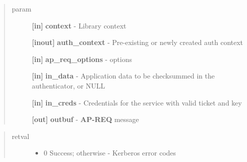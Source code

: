 \documentclass[letterpaper,10pt,english]{sphinxmanual}
\begin{document}
\begin{fulllineitems}
\label{appdev/refs/api/krb5_mk_req_extended:c.krb5_mk_req_extended}
\end{fulllineitems}

\begin{quote}\begin{description}
\item[{param}] \leavevmode
\textbf{{[}in{]}} \textbf{context} - Library context

\textbf{{[}inout{]}} \textbf{auth\_context} - Pre-existing or newly created auth context

\textbf{{[}in{]}} \textbf{ap\_req\_options} -  options

\textbf{{[}in{]}} \textbf{in\_data} - Application data to be checksummed in the authenticator, or NULL

\textbf{{[}in{]}} \textbf{in\_creds} - Credentials for the service with valid ticket and key

\textbf{{[}out{]}} \textbf{outbuf} - \textbf{AP-REQ} message

\end{description}\end{quote}
\begin{quote}\begin{description}
\item[{retval}] \leavevmode\begin{itemize}
\item {} 
0   Success; otherwise - Kerberos error codes

\end{itemize}

\end{description}\end{quote}
\end{document}
